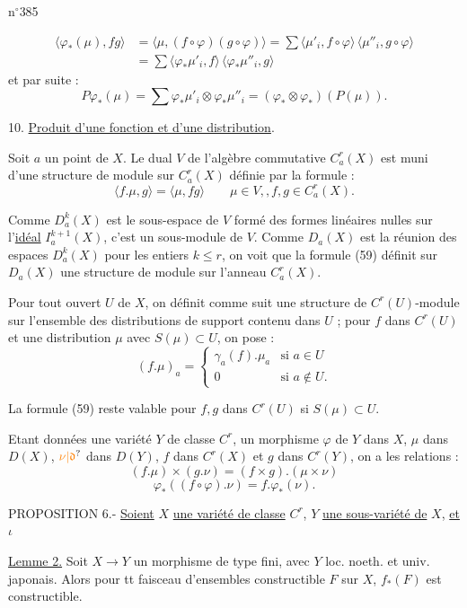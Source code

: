 n$^{\circ}$385

\[
\begin{aligned}
\langle\varphi_*(\mu),fg\rangle&=\langle\mu,(f\circ\varphi)(g\circ\varphi)\rangle=\sum\langle\mu'_i,f\circ\varphi\rangle\,\langle\mu''_i,g\circ\varphi\rangle\\
&=\sum\langle\varphi_*\mu'_i,f\rangle\,\langle\varphi_*\mu''_i,g\rangle
\end{aligned}
\]
et par suite :
\[
P\varphi_*(\mu)=\sum\varphi_*\mu'_i\otimes\varphi_*\mu''_i=(\varphi_*\otimes\varphi_*)(P(\mu)).
\]

10. \uline{Produit d'une fonction et d'une distribution}.

Soit $a$ un point de $X$. Le dual $V$ de l'algèbre commutative $C_a^r(X)$ est muni d'une structure de module sur $C_a^r(X)$ définie par la formule :
\[
\langle f.\mu,g\rangle=\langle\mu,fg\rangle\qquad\mu\in V,,f,g\in C_a^r(X).\tag*{(59)}
\]

Comme $D_a^k(X)$ est le sous-espace de $V$ formé des formes linéaires nulles sur l'\uline{idéal} $I_a^{k+1}(X)$, c'est un sous-module de $V$. Comme $D_a(X)$ est la réunion des espaces $D_a^k(X)$ pour les entiers $k\leq r$, on voit que la formule (59) définit sur $D_a(X)$ une structure de module sur l'anneau $C_a^r(X)$.

Pour tout ouvert $U$ de $X$, on définit comme suit une structure de $C^r(U)$-module sur l'ensemble des distributions de support contenu dans $U$ ; pour $f$ dans $C^r(U)$ et une distribution $\mu$ avec $S(\mu)\subset U$, on pose :
\[
(f.\mu)_a=\begin{cases}
\gamma_a(f).\mu_a & \text{si }a\in U\\
0 & \text{si }a\notin U.
\end{cases}
\]

La formule (59) reste valable pour $f,g$ dans $C^r(U)$ si $S(\mu)\subset U$.

Etant données une variété $Y$ de classe $C^r$, un morphisme $\varphi$ de $Y$ dans $X$, $\mu$ dans $D(X)$, $\unsure{\nu|\mathfrak{d}}$ dans $D(Y)$, $f$ dans $C^r(X)$ et $g$ dans $C^r(Y)$, on a les relations :
\[
(f.\mu)\times(g.\nu)=(f\times g).(\mu\times\nu)\tag*{(60)}
\]
\[
\varphi_*((f\circ\varphi).\nu)=f.\varphi_*(\nu).\tag*{(61)}
\]

PROPOSITION 6.- \uline{Soient} $X$ \uline{une variété de classe} $C^r$, $Y$ \uline{une sous-variété de} $X$, \uline{et} $\iota$

\uline{Lemme 2.} Soit $X\longrightarrow Y$ un morphisme de type fini, avec $Y$ loc. noeth. et univ. japonais. Alors pour tt faisceau d'ensembles constructible $F$ sur $X$, $f_*(F)$ est constructible.

